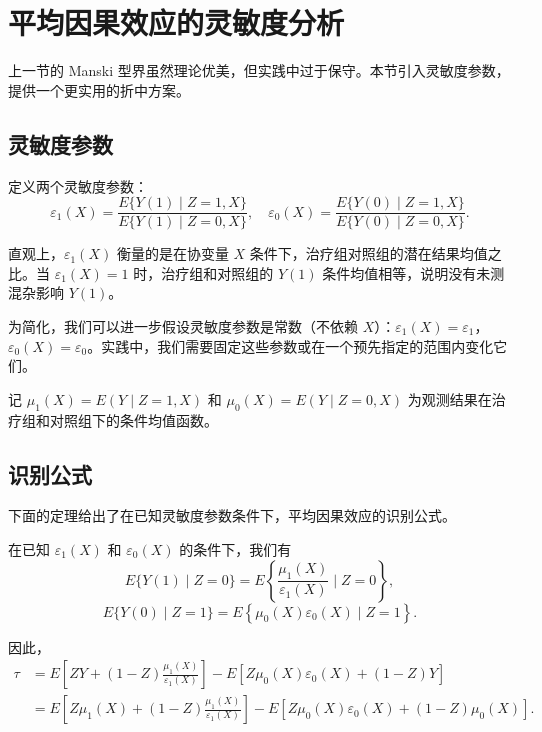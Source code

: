 \section{平均因果效应的灵敏度分析}\label{sec:18-sensitivity-analysis}

上一节的 Manski 型界虽然理论优美，但实践中过于保守。本节引入灵敏度参数，提供一个更实用的折中方案。

\subsection{灵敏度参数}\label{sec:18-sensitivity-parameters}

定义两个灵敏度参数：
\begin{equation}
\varepsilon_1(X) = \frac{E\{Y(1) \mid Z=1, X\}}{E\{Y(1) \mid Z=0, X\}} , \quad
\varepsilon_0(X) = \frac{E\{Y(0) \mid Z=1, X\}}{E\{Y(0) \mid Z=0, X\}} .
\label{eq:18-sensitivity-params}
\end{equation}

直观上，$\varepsilon_1(X)$ 衡量的是在协变量 $X$ 条件下，治疗组对照组的潜在结果均值之比。当 $\varepsilon_1(X) = 1$ 时，治疗组和对照组的 $Y(1)$ 条件均值相等，说明没有未测混杂影响 $Y(1)$。

为简化，我们可以进一步假设灵敏度参数是常数（不依赖 $X$）：$\varepsilon_1(X) = \varepsilon_1$，$\varepsilon_0(X) = \varepsilon_0$。实践中，我们需要固定这些参数或在一个预先指定的范围内变化它们。

记 $\mu_1(X) = E(Y \mid Z=1, X)$ 和 $\mu_0(X) = E(Y \mid Z=0, X)$ 为观测结果在治疗组和对照组下的条件均值函数。

\subsection{识别公式}\label{sec:18-identification-formulas}

下面的定理给出了在已知灵敏度参数条件下，平均因果效应的识别公式。

\begin{Theorem}\label{th:18-1}
在已知 $\varepsilon_1(X)$ 和 $\varepsilon_0(X)$ 的条件下，我们有
\[
E\{Y(1) \mid Z=0\} = E\left\{\frac{\mu_1(X)}{\varepsilon_1(X)} \mid Z=0\right\} ,
\]
\[
E\{Y(0) \mid Z=1\} = E\left\{\mu_0(X)\varepsilon_0(X) \mid Z=1\right\} .
\]

因此，
\begin{align}
\tau &= E\left[ZY + (1-Z)\frac{\mu_1(X)}{\varepsilon_1(X)}\right] - E\left[Z\mu_0(X)\varepsilon_0(X) + (1-Z)Y\right] \label{eq:18-ace-regression} \\
&= E\left[Z\mu_1(X) + (1-Z)\frac{\mu_1(X)}{\varepsilon_1(X)}\right] - E\left[Z\mu_0(X)\varepsilon_0(X) + (1-Z)\mu_0(X)\right] . \label{eq:18-ace-regression-alt}
\end{align}
\end{Theorem}

